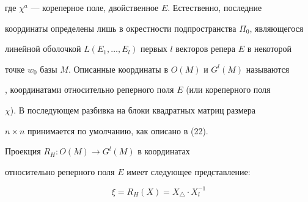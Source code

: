 где $\chi ^a$ --- кореперное поле, двойственное $E$. Естественно, последние


координаты определены лишь в окрестности подпространства $\Pi_0$, являющегося


линейной оболочкой $L(E_1,\dotsc,E_l)$ первых $l$ векторов репера $E$ в некоторой


точке $w_0$ базы $M$. Описанные координаты в $O(M)$ и $G^l(M)$ называются


\cite{Far1}, \cite{Far2} координатами относительно реперного поля $E$ (или кореперного поля


$\chi $). В последующем разбивка на блоки квадратных матриц размера


$n\times n$ принимается по умолчанию, как описано в (22).





\begin{lems} Проекция $R_H: O(M)\to G^l(M)$ в координатах


относительно реперного поля $E$ имеет следующее представление:


\begin{equation}


\xi = R_H(X)=X_\triangle \cdot X_l^{-1}


\end{equation}


\end{lems}





